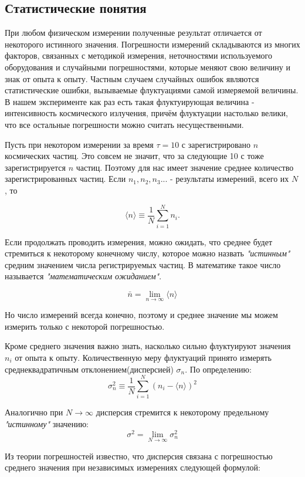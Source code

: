 \documentclass[12pt, a4paper]{article}
\begin{document}
\subsection{Статистические понятия}

При любом физическом измерении полученные результат отличается
от некоторого истинного значения. Погрешности измерений складываются
из многих факторов, связанных с методикой измерения, неточностями
используемого оборудования и случайными погрешностями, которые
меняют свою величину и знак от опыта к опыту. Частным случаем случайных
ошибок являются статистические ошибки, вызываемые флуктуациями самой
измеряемой величины. В нашем эксперименте как раз есть такая флуктуирующая
величина - интенсивность космического излучения, причём флуктуации
настолько велики, что все остальные погрешности можно считать несущественными.


Пусть при некотором измерении за время $\tau = 10$ с зарегистрировано
$n$ космических частиц. Это совсем не значит, что за следующие 10 с
тоже зарегистрируется $n$ частиц. Поэтому для нас имеет значение среднее
количество зарегистрированных частиц. Если $n_1, n_2, n_3...$ - результаты
измерений, всего их $N$, то

\[\langle n \rangle \equiv \frac{1}{N}\sum_{i = 1}^{N}{n_i}.\]

Если продолжать проводить измерения, можно ожидать, что среднее будет
стремиться к некоторому конечному числу, которое можно назвать
\textit{"истинным"} средним значением числа регистрируемых частиц.
В математике такое число называется \textit{"математическим ожиданием"}.

\[\bar{n} = \lim_{n\to\infty} \langle n \rangle\]

Но число измерений всегда конечно, поэтому и среднее значение мы
можем измерить только с некоторой погрешностью.


Кроме среднего значения важно знать, насколько сильно флуктуируют
значения $n_i$ от опыта к опыту. Количественную меру флуктуаций принято
измерять среднеквадратичным отклонением(дисперсией) $\sigma_n$. По определению:
\[\sigma_n ^ 2 \equiv \frac{1}{N}\sum_{i = 1}^{N}{(n_i - \langle n \rangle) ^ 2}\]

Аналогично при $N\to\infty$ дисперсия стремится к некоторому предельному
\textit{"истинному"} значению:
\[\sigma ^ 2 = \lim_{N\to\infty}\sigma_n ^ 2\]


Из теории погрешностей известно, что дисперсия связана с погрешностью
среднего значения при независимых измерениях следующей формулой:
\end{document}
